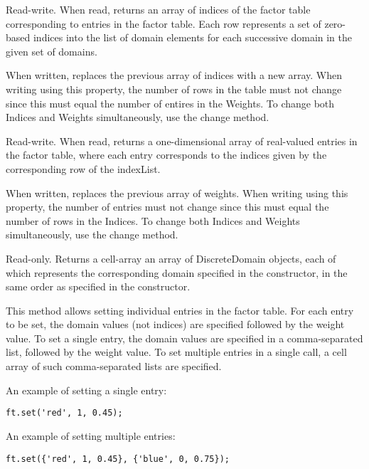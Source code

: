 \fi



Read-write.  When read, returns an array of indices of the factor table corresponding to entries in the factor table.  Each row represents a set of zero-based indices into the list of domain elements for each successive domain in the given set of domains.

When written, replaces the previous array of indices with a new array.  When writing using this property, the number of rows in the table must not change since this must equal the number of entires in the Weights.  To change both Indices and Weights simultaneously, use the change method.


Read-write.  When read, returns a one-dimensional array of real-valued entries in the factor table, where each entry corresponds to the indices given by the corresponding row of the indexList.

When written, replaces the previous array of weights.  When writing using this property, the number of entries must not change since this must equal the number of rows in the Indices.  To change both Indices and Weights simultaneously, use the change method.


Read-only.  Returns \ifmatlab a cell-array \fi \ifjava an array \fi of DiscreteDomain objects, each of which represents the corresponding domain specified in the constructor, in the same order as specified in the constructor.



\label{sec:FactorTable.set}


\ifmatlab

This method allows setting individual entries in the factor table.  For each entry to be set, the domain values (not indices) are specified followed by the weight value.  To set a single entry, the domain values are specified in a comma-separated list, followed by the weight value.  To set multiple entries in a single call, a cell array of such comma-separated lists are specified.

An example of setting a single entry:
\begin{lstlisting}
ft.set('red', 1, 0.45);
\end{lstlisting}

An example of setting multiple entries:
\begin{lstlisting}
ft.set({'red', 1, 0.45}, {'blue', 0, 0.75});
\end{lstlisting}
\fi

